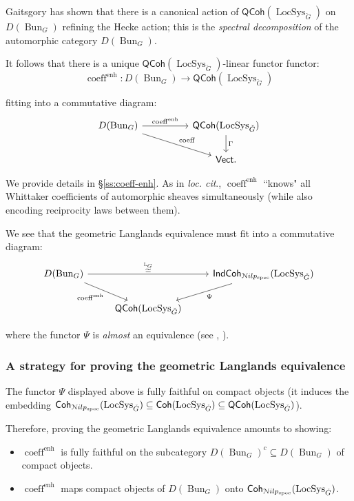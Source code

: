\documentclass[reqno,11pt]{amsart}
\numberwithin{equation}{subsection}
\theoremstyle{remark}
\newcommand{\bL}{{\mathbb L}}
\newcommand{\sN}{{\EuScript N}}
\newcommand{\on}{\operatorname}
\newcommand{\Vect}{\mathsf{Vect}}
\newcommand{\Bun}{\on{Bun}}
\newcommand{\LocSys}{\on{LocSys}}
\newcommand{\Coh}{\mathsf{Coh}}
\newcommand{\IndCoh}{\mathsf{IndCoh}}
\newcommand{\QCoh}{\mathsf{QCoh}}
\renewcommand{\subset}{\subseteq}
\newcommand{\coeff}{\on{coeff}}
\newcommand{\enh}{\on{enh}}
\newcommand{\Nilp}{\sN ilp}
\begin{document}
Gaitsgory has shown \cite{generalized-vanishing} that there
is a canonical action of $\QCoh(\LocSys_{\check{G}})$ on 
$D(\Bun_G)$ refining the Hecke action; this is the 
\emph{spectral decomposition} of the automorphic category
$D(\Bun_G)$.

It follows that there is a unique $\QCoh(\LocSys_{\check{G}})$-linear functor
functor:
%
\[
\coeff^{\enh}:D(\Bun_G) \to \QCoh(\LocSys_{\check{G}})
\]

\noindent fitting into a commutative diagram:
%
\[
\begin{tikzcd}
D(\Bun_G)
\arrow[rr,"\coeff^{\enh}"]
\arrow[drr,"\coeff"]
&&
\QCoh(\LocSys_{\check{G}})
\arrow[d,"\Gamma"]
\\
&&
\Vect.
\end{tikzcd}
\]

\noindent We provide details in \S \ref{ss:coeff-enh}. As in \emph{loc. cit}.,
$\coeff^{\enh}$ ``knows" all Whittaker coefficients of automorphic 
sheaves simultaneously (while also encoding reciprocity laws between them).

We see that the geometric Langlands equivalence must fit into a commutative
diagram:
%
\[
\begin{tikzcd}
D(\Bun_G) 
\arrow[rr,"\overset{\bL_G}{\simeq}"] 
\arrow[dr,"\coeff^{\enh}",swap]
&&
\IndCoh_{\Nilp_{\on{spec}}}(\LocSys_{\check{G}})
\arrow[dl,"\Psi"]
\\
&
\QCoh(\LocSys_{\check{G}})
\end{tikzcd}
\]

\noindent where the functor $\Psi$ is \emph{almost} an equivalence
(see \cite{indcoh}, \cite{arinkin-gaitsgory}).

\subsubsection{A strategy for proving the geometric Langlands equivalence}\label{sss:strategy}

The functor $\Psi$ displayed above is fully faithful on compact
objects (it induces the embedding 
$\Coh_{\Nilp_{\on{spec}}}(\LocSys_{\check{G}}) \subset \Coh(\LocSys_{\check{G}})
\subset \QCoh(\LocSys_{\check{G}})$).

Therefore, proving the geometric Langlands equivalence 
amounts to showing:

\begin{itemize}

\item $\coeff^{\enh}$ is fully faithful on the subcategory
$D(\Bun_G)^c \subset D(\Bun_G)$ of
compact objects.

\item $\coeff^{\enh}$ maps compact objects of $D(\Bun_G)$ onto
$\Coh_{\Nilp_{\on{spec}}}(\LocSys_{\check{G}})$.

\end{itemize}
\end{document}
